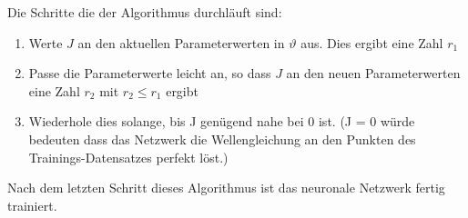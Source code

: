 Die Schritte die der Algorithmus durchläuft sind:
\begin{enumerate}
    \item Werte \( J \) an den aktuellen Parameterwerten in \( \vartheta \) aus. Dies ergibt eine Zahl \( r_1 \)
    \item Passe die Parameterwerte leicht an, so dass \( J \) an den neuen Parameterwerten eine Zahl \( r_2 \) mit \( r_2 \leq r_1 \) ergibt
    \item Wiederhole dies solange, bis J genügend nahe bei 0 ist. (J = 0 würde bedeuten dass das Netzwerk die Wellengleichung an den Punkten des Trainings-Datensatzes perfekt löst.)
\end{enumerate}

Nach dem letzten Schritt dieses Algorithmus ist das neuronale Netzwerk fertig trainiert.
